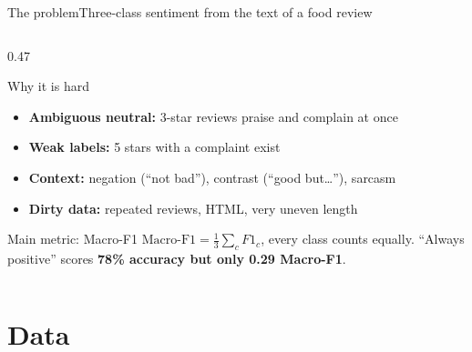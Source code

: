\documentclass[aspectratio=169,10pt]{beamer}
\begin{document}
\begin{frame}{The problem}{Three-class sentiment from the text of a food review}
\begin{columns}[T]
\begin{column}{0.47\textwidth}
\begin{block}{Why it is hard}
\begin{itemize}
          \item \textbf{Ambiguous neutral:} 3-star reviews praise and complain at once
          \item \textbf{Weak labels:} 5 stars with a complaint exist
          \item \textbf{Context:} negation (``not bad''), contrast (``good but\ldots''), sarcasm
          \item \textbf{Dirty data:} repeated reviews, HTML, very uneven length
        \end{itemize}
      \end{block}
      \begin{alertblock}{Main metric: Macro-F1}
        \footnotesize
        $\text{Macro-F1}=\frac13\sum_c F1_c$, every class counts equally. ``Always positive'' scores \textbf{78\% accuracy but only 0.29 Macro-F1}.
      \end{alertblock}
    \end{column}
  \end{columns}
\end{frame}

\section{Data}
\end{document}
